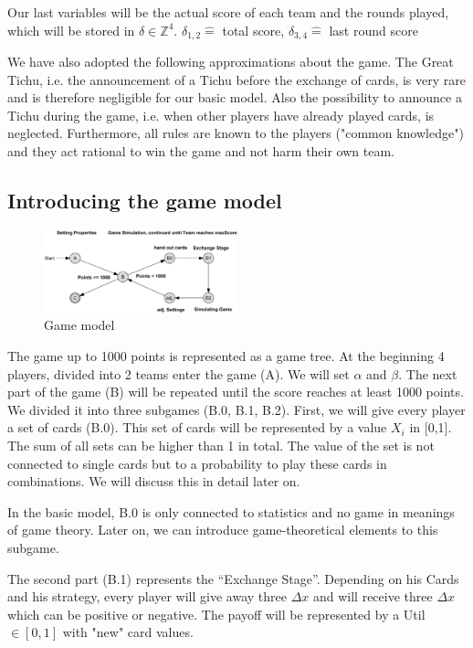 Our last variables will be the actual score of each team and the rounds played, which will be stored in $\delta \in \mathbb{Z}^4$. 
$\delta_{1,2} \widehat{=}$ total score, $\delta_{3,4} \widehat{=}$ last round score

We have also adopted the following approximations about the game.
The Great Tichu, i.e. the announcement of a Tichu before the exchange of cards, is very rare and is therefore negligible for our basic model.
Also the possibility to announce a Tichu during the game, i.e. when other players have already played cards, is neglected.
Furthermore, all rules are known to the players ("common knowledge") and they act rational to win the game and not harm their own team. 

\subsection{Introducing the game model}

\begin{figure}[h]
    \centering
    \includegraphics[width=0.5\textwidth]{Bilder/graph}
    \caption{Game model}
    \label{fig:meine-grafik}
\end{figure}

The game up to 1000 points is represented as a game tree.
At the beginning 4 players, divided into 2 teams enter the game (A). We will set $\alpha$ and $\beta$. 
The next part of the game (B) will be repeated until the score reaches at least 1000 points. We divided it into three subgames (B.0, B.1, B.2).
First, we will give every player a set of cards (B.0). This set of cards will be represented by a value $X_i$ in [0,1]. The sum of all sets can be higher than 1 in total. The value of the set is not connected to single cards but to a probability to play these cards in combinations. We will discuss this in detail later on.

In the basic model, B.0 is only connected to statistics and no game in meanings of game theory. Later on, we can introduce game-theoretical elements to this subgame. 

The second part (B.1) represents the “Exchange Stage”. Depending on his Cards and his strategy, every player will give away three $\Delta x$ and will receive three $\Delta x$ which can be positive or negative. The payoff will be represented by a Util$\in [0,1]$ with "new" card values.

